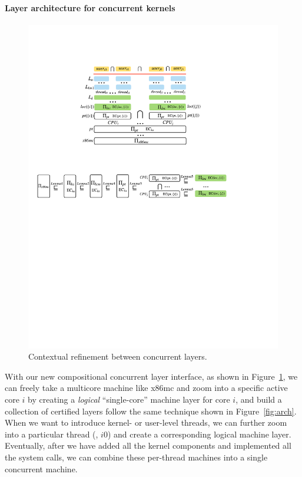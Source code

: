 \paragraph{Layer architecture for concurrent kernels}

\begin{figure}\centering
\includegraphics[scale=1]{figs/refine_layer}
\caption{Contextual refinement between concurrent layers.}
\label{fig:spec:refine_layer}
\end{figure}

With our new compositional concurrent layer interface, as shown in
Figure~\ref{fig:spec:refine_layer}, we can freely take a multicore
machine like x86mc and zoom into a specific active core $i$ by
creating a {\em logical} ``single-core'' machine layer for core $i$,
and build
a collection of certified layers
follow the same technique shown in Figure~\ref{fig:arch}. 
When we want to introduce kernel- or
user-level threads, we can further zoom into a particular thread
(\eg, $i0$) and create a corresponding logical machine
layer. Eventually, after we have added all the kernel components and
implemented all the system calls, we can combine these per-thread
machines into a single concurrent machine.

